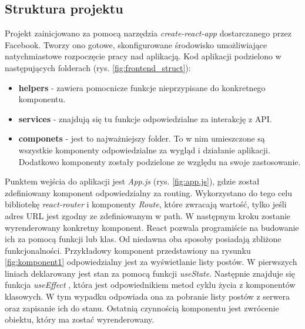 \documentclass[declaration,shortabstract,polish,inz]{iithesis}
\begin{document}
\subsection{Struktura projektu}
Projekt zainicjowano za pomocą narzędzia \textit{create-react-app} \cite{cra} dostarczanego przez Facebook. Tworzy ono gotowe, skonfigurowane środowisko umożliwiające natychmiastowe rozpoczęcie pracy nad aplikacją. Kod aplikacji podzielono w następujących folderach (rys. \ref{fig:frontend_struct}):
\begin{itemize}
    \item \textbf{\textunderscore helpers} - zawiera pomocnicze funkcje nieprzypisane do konkretnego komponentu.
    \item \textbf{\textunderscore services} - znajdują się tu funkcje odpowiedzialne za interakcję z API.
    \item \textbf{componets} - jest to najważniejszy folder. To w nim umieszczone są wszystkie komponenty odpowiedzialne za wygląd i działanie aplikacji. Dodatkowo komponenty zostały podzielone ze względu na swoje zastosowanie.
\end{itemize}

Punktem wejścia do aplikacji jest \textit{App.js} (rys. \ref{fig:app.js}), gdzie został zdefiniowany komponent odpowiedzialny za routing. Wykorzystano do tego celu bibliotekę \textit{react-router}\cite{reactrouter} i komponenty \textit{Route}, które zwracają wartość, tylko jeśli adres URL jest zgodny ze zdefiniowanym w path. W następnym kroku zostanie wyrenderowany konkretny komponent. React pozwala programiście na budowanie ich za pomocą funkcji lub klas. Od niedawna oba sposoby posiadają zbliżone funkcjonalności. Przykładowy komponent przedstawiony na rysunku \ref{fig:komponent1} odpowiedzialny jest za wyświetlanie listy postów. W pierwszych liniach deklarowany jest stan za pomocą funkcji \textit{useState}. Następnie znajduje się funkcja \textit{useEffect} \cite{hooks}, która jest odpowiednikiem metod cyklu życia z komponentów klasowych. W tym wypadku odpowiada ona za pobranie listy postów z serwera oraz zapisanie ich do stanu. Ostatnią czynnością komponentu jest zwrócenie obiektu, który ma zostać wyrenderowany.
\end{document}
